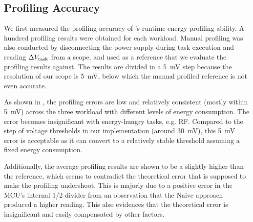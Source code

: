 

\subsection{Profiling Accuracy}



We first measured the profiling accuracy of \nn{}'s runtime energy profiling ability. 
A hundred profiling results were obtained for each workload. 
Manual profiling was also conducted by disconnecting the power supply during task execution and reading $\Delta V_{\text{task}}$ from a scope, and used as a reference that we evaluate the profiling results against. 
The results are divided in a \SI{5}{\milli\volt} step because the resolution of our scope is \SI{5}{\milli\volt}, below which the manual profiled reference is not even accurate. 

As shown in , the profiling errors are low and relatively consistent (mostly within \SI{5}{\milli\volt}) across the three workload with different levels of energy consumption. 
The error becomes insignificant with energy-hungry tasks, e.g. RF. 
Compared to the step of voltage thresholds in our implementation (around \SI{30}{\milli\volt}), this \SI{5}{\milli\volt} error is acceptable as it can convert to a relatively stable threshold assuming a fixed energy consumption. 

Additionally, the average profiling results are shown to be a slightly higher than the reference, which 
seems to contradict the theoretical error that is supposed to make the profiling undershoot.
This is majorly due to a positive error in the MCU's internal 1/2  divider from an observation that the Naive approach produced a higher reading. 
This also evidences that the theoretical error is insignificant and easily compensated by other factors. 


